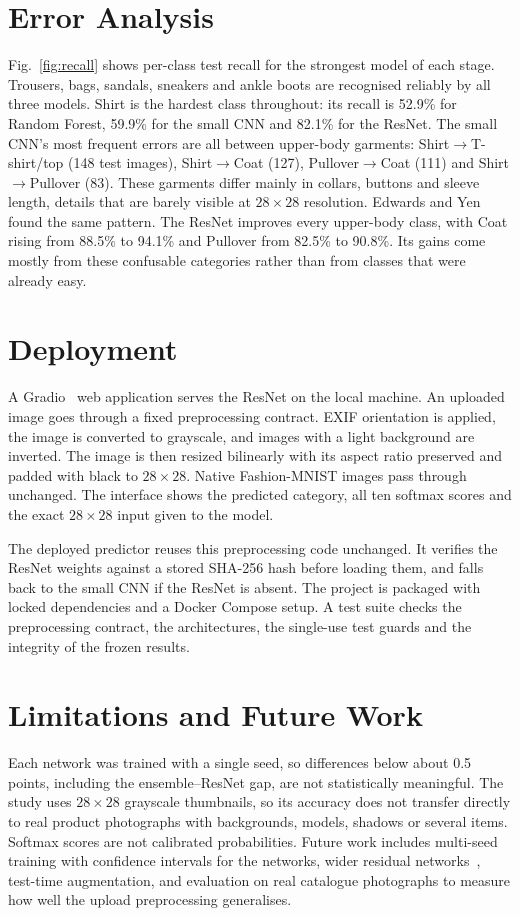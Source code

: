 \documentclass[conference]{IEEEtran}
\begin{document}
\section{Error Analysis}
Fig.~\ref{fig:recall} shows per-class test recall for the strongest model of each stage. Trousers, bags, sandals, sneakers and ankle boots are recognised reliably by all three models. Shirt is the hardest class throughout: its recall is 52.9\% for Random Forest, 59.9\% for the small CNN and 82.1\% for the ResNet. The small CNN's most frequent errors are all between upper-body garments: Shirt$\to$T-shirt/top (148 test images), Shirt$\to$Coat (127), Pullover$\to$Coat (111) and Shirt$\to$Pullover (83). These garments differ mainly in collars, buttons and sleeve length, details that are barely visible at $28\times28$ resolution. Edwards and Yen~\cite{edwards2019fashion} found the same pattern. The ResNet improves every upper-body class, with Coat rising from 88.5\% to 94.1\% and Pullover from 82.5\% to 90.8\%. Its gains come mostly from these confusable categories rather than from classes that were already easy.

\section{Deployment}
A Gradio~\cite{abid2019gradio} web application serves the ResNet on the local machine. An uploaded image goes through a fixed preprocessing contract. EXIF orientation is applied, the image is converted to grayscale, and images with a light background are inverted. The image is then resized bilinearly with its aspect ratio preserved and padded with black to $28\times28$. Native Fashion-MNIST images pass through unchanged. The interface shows the predicted category, all ten softmax scores and the exact $28\times28$ input given to the model.

The deployed predictor reuses this preprocessing code unchanged. It verifies the ResNet weights against a stored SHA-256 hash before loading them, and falls back to the small CNN if the ResNet is absent. The project is packaged with locked dependencies and a Docker Compose setup. A test suite checks the preprocessing contract, the architectures, the single-use test guards and the integrity of the frozen results.

\section{Limitations and Future Work}
Each network was trained with a single seed, so differences below about 0.5 points, including the ensemble--ResNet gap, are not statistically meaningful. The study uses $28\times28$ grayscale thumbnails, so its accuracy does not transfer directly to real product photographs with backgrounds, models, shadows or several items. Softmax scores are not calibrated probabilities. Future work includes multi-seed training with confidence intervals for the networks, wider residual networks~\cite{zhong2017random}, test-time augmentation, and evaluation on real catalogue photographs to measure how well the upload preprocessing generalises.
\end{document}
